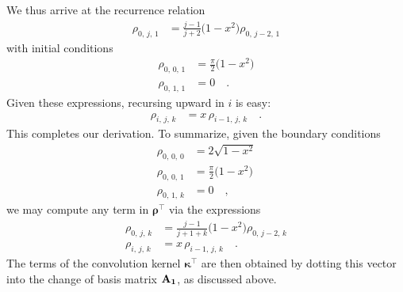 \documentclass[modern]{aastex62}
\newcommand{\AOne}{\bvec{A_1}}
\newcommand{\kT}{\boldsymbol{\kappa}^\top}
\newcommand{\rhoT}{\boldsymbol{\rho}^\top}
\begin{document}
%
We thus arrive at the recurrence relation
%
\begin{align}
    \rho_{0,\,j,\,1} &= \frac{j - 1}{j + 2} \big(1 - x^2\big) \rho_{0,\,j-2,\,1}
\end{align}
%
with initial conditions
%
\begin{align}
    \rho_{0,\,0,\,1} &= \frac{\pi}{2} \big(1-x^2\big) \nonumber \\
    \rho_{0,\,1,\,1} &= 0 \quad.
\end{align}
%
Given these expressions, recursing upward in $i$ is easy:
%
\begin{align}
    \rho_{i,\,j,\,k} &= x \, \rho_{i-1,\,j,\,k} \quad.
\end{align}
%
This completes our derivation. To summarize, given the boundary conditions
%
\begin{align}
    \rho_{0,\,0,\,0} &= 2 \sqrt{1-x^2} \nonumber \\
    \rho_{0,\,0,\,1} &= \frac{\pi}{2} \big(1-x^2\big) \nonumber \\
    \rho_{0,\,1,\,k} &= 0 \quad ,
\end{align}
%
we may compute any term in $\rhoT$ via the expressions
%
\begin{align}
    \label{eq:kT:sTrecurrence}
    \rho_{0,\,j,\,k} &= \frac{j - 1}{j + 1 + k} \big(1 - x^2\big) \rho_{0,\,j-2,\,k} \nonumber \\
    \rho_{i,\,j,\,k} &= x \, \rho_{i-1,\,j,\,k} \quad.
\end{align}
%
The terms of the convolution kernel $\kT$ are then obtained by dotting
this vector into the change of basis matrix $\AOne$, as discussed above.


\end{document}
